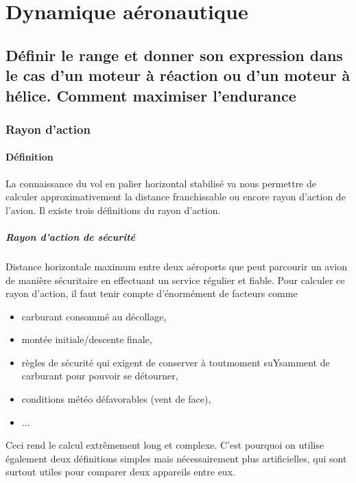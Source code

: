 \documentclass{report}
\begin{document}
\pagestyle{fancy} 
\renewcommand{\footrulewidth}{1pt}

\renewcommand{\thesection}{\arabic{section}}
\renewcommand{\partname}{}
\renewcommand{\labelitemii}{$\bullet$}




\newpage

\chapter{Dynamique aéronautique}

\section{Définir le range et donner son expression dans le cas d'un moteur à réaction ou d'un moteur à hélice. Comment maximiser l'endurance}

\subsection{Rayon d'action}

\subsubsection{Définition} La connaissance du vol en palier horizontal stabilisé va nous permettre de calculer approximativement la distance franchissable ou encore rayon d’action de l’avion. Il existe trois définitions du rayon d’action.

\paragraph{Rayon d’action de sécurité} Distance horizontale maximum entre deux aéroports
que peut parcourir un avion de manière sécuritaire en effectuant un service
régulier et fiable. Pour calculer ce rayon d’action, il faut tenir compte d'énormément de facteurs comme 
\begin{itemize}
    \item carburant consommé au décollage,
    \item montée initiale/descente finale,
    \item règles de sécurité qui exigent de conserver à toutmoment suYsamment
de carburant pour pouvoir se détourner,
\item conditions météo défavorables (vent de face),
\item ...
\end{itemize}
Ceci rend le calcul extrêmement long et complexe. C’est pourquoi on utilise
également deux définitions simples mais nécessairement plus artificielles,
qui sont surtout utiles pour comparer deux appareils entre eux.
\end{document}
